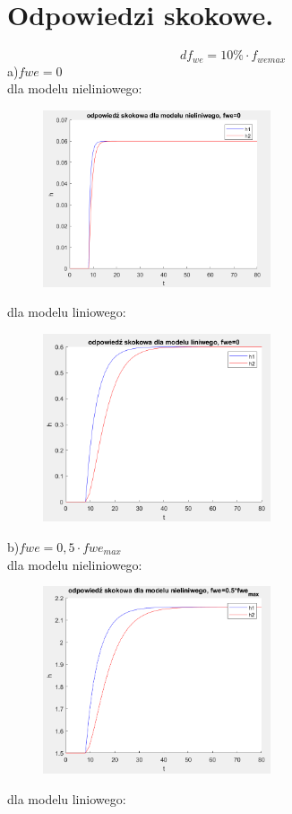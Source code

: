 \documentclass{article}
\begin{document}
\section{Odpowiedzi skokowe.}
 $$df_{we}=10\% \cdot f_{we max}$$
 a)$fwe=0$\\
 dla modelu nieliniowego:
 \begin{figure}[h!]
    \centering
    \includegraphics[width=0.6\textwidth]{NL0P.png}
    \label{fig:my_label}
\end{figure}
\newpage
dla modelu liniowego:
\begin{figure}[h!]
    \centering
    \includegraphics[width=0.6\textwidth]{L0P.png}
    \label{fig:my_label}
\end{figure}
\begin{flushleft}
b)$fwe=0,5\cdot fwe_{max}$\\
 dla modelu nieliniowego:
\end{flushleft}
 
 \begin{figure}[h!]
    \centering
    \includegraphics[width=0.6\textwidth] {NL05P.png}
    \label{fig:my_label}
\end{figure}
\newpage
\begin{flushleft}
dla modelu liniowego:
\end{flushleft}
\end{document}
